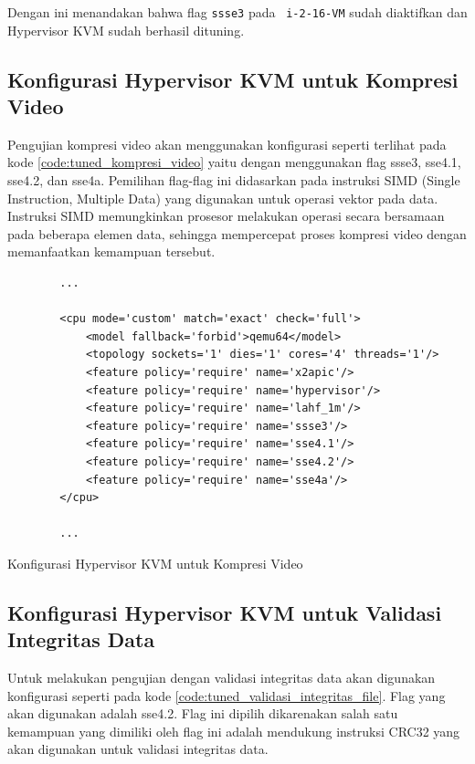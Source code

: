 Dengan ini menandakan bahwa flag \texttt{ssse3} pada \vm\ \texttt{i-2-16-VM} sudah diaktifkan dan Hypervisor KVM sudah berhasil dituning.

\subsection{Konfigurasi Hypervisor KVM untuk Kompresi Video}
Pengujian kompresi video akan menggunakan konfigurasi seperti terlihat pada kode \ref{code:tuned_kompresi_video} yaitu dengan menggunakan flag ssse3, sse4.1, sse4.2, dan sse4a. Pemilihan flag-flag ini didasarkan pada instruksi SIMD (Single Instruction, Multiple Data) yang digunakan untuk operasi vektor pada data. Instruksi SIMD memungkinkan prosesor melakukan operasi secara bersamaan pada beberapa elemen data, sehingga mempercepat proses kompresi video dengan memanfaatkan kemampuan tersebut.

\begin{listing}[H]
    \begin{verbatim}
        ...

        <cpu mode='custom' match='exact' check='full'>
            <model fallback='forbid'>qemu64</model>
            <topology sockets='1' dies='1' cores='4' threads='1'/>
            <feature policy='require' name='x2apic'/>
            <feature policy='require' name='hypervisor'/> 
            <feature policy='require' name='lahf_1m'/>
            <feature policy='require' name='ssse3'/>
            <feature policy='require' name='sse4.1'/>
            <feature policy='require' name='sse4.2'/>
            <feature policy='require' name='sse4a'/>
        </cpu>
        
        ...
    \end{verbatim}
    \caption{Konfigurasi Hypervisor KVM untuk Kompresi Video}
    \label{code:tuned_kompresi_video}
\end{listing}

\subsection{Konfigurasi Hypervisor KVM untuk Validasi Integritas Data}
Untuk melakukan pengujian dengan validasi integritas data akan digunakan konfigurasi seperti pada kode \ref{code:tuned_validasi_integritas_file}. Flag yang akan digunakan adalah sse4.2. Flag ini dipilih dikarenakan salah satu kemampuan yang dimiliki oleh flag ini adalah mendukung instruksi CRC32 yang akan digunakan untuk validasi integritas data.

